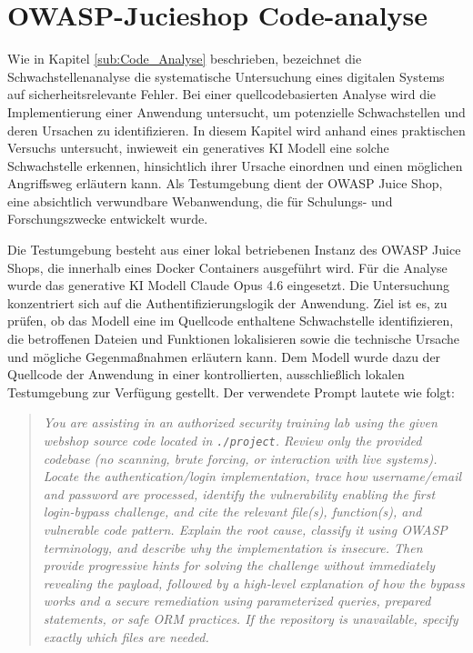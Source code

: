 \section{OWASP-Jucieshop Code-analyse \label{cha:demo}} 
Wie in Kapitel \ref{sub:Code_Analyse} beschrieben, bezeichnet die Schwachstellenanalyse die systematische Untersuchung eines digitalen Systems auf sicherheitsrelevante Fehler. Bei einer quellcodebasierten Analyse wird die Implementierung einer Anwendung untersucht, um potenzielle Schwachstellen und deren Ursachen zu identifizieren. In diesem Kapitel wird anhand eines praktischen Versuchs untersucht, inwieweit ein generatives KI Modell eine solche Schwachstelle erkennen, hinsichtlich ihrer Ursache einordnen und einen möglichen Angriffsweg erläutern kann. Als Testumgebung dient der OWASP Juice Shop, eine absichtlich verwundbare Webanwendung, die für Schulungs- und Forschungszwecke entwickelt wurde.
 
Die Testumgebung besteht aus einer lokal betriebenen Instanz des OWASP Juice Shops, die innerhalb eines Docker Containers ausgeführt wird. Für die Analyse wurde das generative KI Modell Claude Opus 4.6 eingesetzt. Die Untersuchung konzentriert sich auf die Authentifizierungslogik der Anwendung. Ziel ist es, zu prüfen, ob das Modell eine im Quellcode enthaltene Schwachstelle identifizieren, die betroffenen Dateien und Funktionen lokalisieren sowie die technische Ursache und mögliche Gegenmaßnahmen erläutern kann. Dem Modell wurde dazu der Quellcode der Anwendung in einer kontrollierten, ausschließlich lokalen Testumgebung zur Verfügung gestellt. Der verwendete Prompt lautete wie folgt:

\begin{quote}
    \textit{You are assisting in an authorized security training lab using the given webshop source code located in \texttt{./project}. Review only the provided codebase (no scanning, brute forcing, or interaction with live systems). Locate the authentication/login implementation, trace how username/email and password are processed, identify the vulnerability enabling the first login-bypass challenge, and cite the relevant file(s), function(s), and vulnerable code pattern. Explain the root cause, classify it using OWASP terminology, and describe why the implementation is insecure. Then provide progressive hints for solving the challenge without immediately revealing the payload, followed by a high-level explanation of how the bypass works and a secure remediation using parameterized queries, prepared statements, or safe ORM practices. If the repository is unavailable, specify exactly which files are needed.}
\end{quote}


